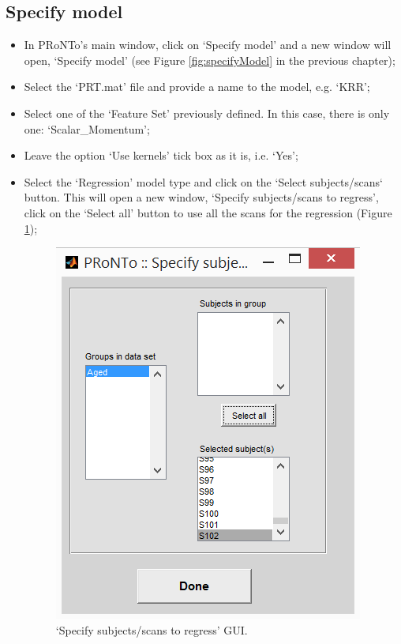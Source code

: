 
\subsection{Specify model}
\begin{itemize}

    \item In PRoNTo's main window, click on `Specify model' and a new window will open, `Specify model' (see Figure \ref{fig:specifyModel} in the previous chapter);

   	\item Select the `PRT.mat' file and provide a name to the model, e.g. `KRR';

    \item Select one of the `Feature Set' previously defined. In this case, there is only one: `Scalar\_Momentum';

	\item Leave the option `Use kernels' tick box as it is, i.e. `Yes';
	
	\item Select the `Regression' model type and click on the `Select subjects/scans` button. This will open a new window, `Specify subjects/scans to regress', click on the `Select all' button to use all the scans for the regression  (Figure \ref{fig:specifySubjects});
	

        \begin{figure}[h!]
            \begin{center}
                \includegraphics[scale=0.75]{images/Tutorial/regression/specifySubjects}
            \end{center}
            \caption{`Specify subjects/scans to regress' GUI.}
            \label{fig:specifySubjects}
        \end{figure}
        

\end{itemize}

